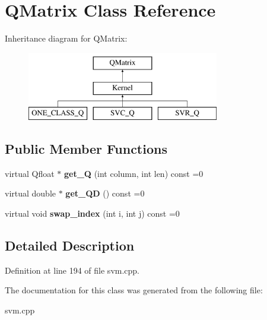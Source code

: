 \hypertarget{class_q_matrix}{
\section{QMatrix Class Reference}
\label{class_q_matrix}
}
Inheritance diagram for QMatrix:\begin{figure}[H]
\begin{center}
\leavevmode
\includegraphics[height=3cm]{class_q_matrix}
\end{center}
\end{figure}
\subsection*{Public Member Functions}
\begin{DoxyCompactItemize}
\item 
\hypertarget{class_q_matrix_a87c11086390c81293d2978e042be3d10}{
virtual Qfloat $\ast$ {\bfseries get\_\-Q} (int column, int len) const =0}
\label{class_q_matrix_a87c11086390c81293d2978e042be3d10}

\item 
\hypertarget{class_q_matrix_af04994d9632b6194f626c431ce93083f}{
virtual double $\ast$ {\bfseries get\_\-QD} () const =0}
\label{class_q_matrix_af04994d9632b6194f626c431ce93083f}

\item 
\hypertarget{class_q_matrix_acb4e256ebe3008dff0d4b5414102dbe7}{
virtual void {\bfseries swap\_\-index} (int i, int j) const =0}
\label{class_q_matrix_acb4e256ebe3008dff0d4b5414102dbe7}

\end{DoxyCompactItemize}


\subsection{Detailed Description}


Definition at line 194 of file svm.cpp.



The documentation for this class was generated from the following file:\begin{DoxyCompactItemize}
\item 
svm.cpp\end{DoxyCompactItemize}
